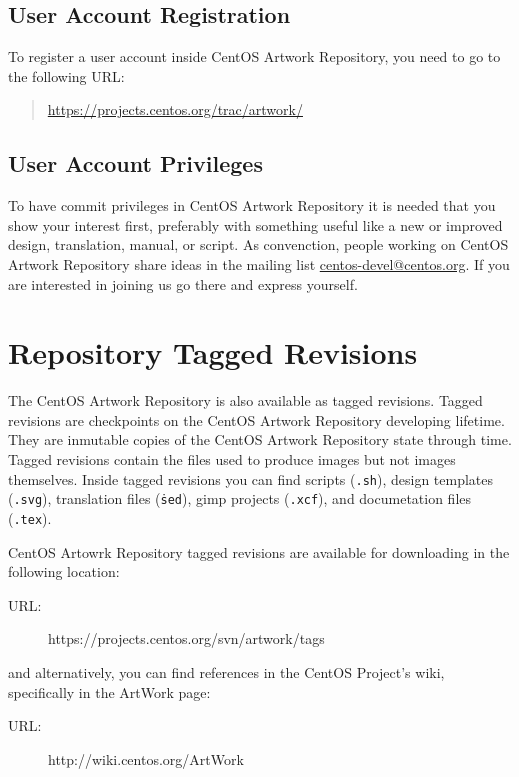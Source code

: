 \subsection{User Account Registration}
\label{sec:Configuration:Account}

To register a user account inside CentOS Artwork Repository, you need
to go to the following URL:

\begin{quote}
\url{https://projects.centos.org/trac/artwork/}
\end{quote}

\subsection{User Account Privileges}
\label{sec:Configuration:User:Privileges}

To have commit privileges in CentOS Artwork Repository it is needed
that you show your interest first, preferably with something useful
like a new or improved design, translation, manual, or script. As
convenction, people working on CentOS Artwork Repository share ideas
in the mailing list
\href{mailto:centos-devel@centos.org}{centos-devel@centos.org}. If you
are interested in joining us go there and express yourself.

\section{Repository Tagged Revisions}

The CentOS Artwork Repository is also available as tagged revisions.
Tagged revisions are checkpoints on the CentOS Artwork Repository
developing lifetime. They are inmutable copies of the CentOS Artwork
Repository state through time.  Tagged revisions contain the files
used to produce images but not images themselves.  Inside tagged
revisions you can find scripts (\texttt{.sh}), design templates
(\texttt{.svg}), translation files (\texttt{\.sed}), gimp projects
(\texttt{.xcf}), and documetation files (\texttt{.tex}).

CentOS Artowrk Repository tagged revisions are available for
downloading in the following location:

\begin{description}
\item[URL:] https://projects.centos.org/svn/artwork/tags
\end{description}

and alternatively, you can find references in the CentOS Project's
wiki, specifically in the ArtWork page:

\begin{description}
\item[URL:] http://wiki.centos.org/ArtWork
\end{description}
